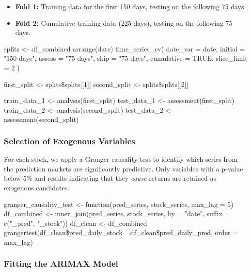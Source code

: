 \documentclass[12pt]{report}
\begin{document}
\begin{itemize}
    \item \textbf{Fold 1:} Training data for the first 150 days, testing on the following 75 days.
    \item \textbf{Fold 2:} Cumulative training data (225 days), testing on the following 75 days.
\end{itemize}

\begin{code}
splits <- df_combined %
  arrange(date) %
  time_series_cv(
    date_var   = date,
    initial    = "150 days",
    assess     = "75 days",
    skip       = "75 days",
    cumulative = TRUE,
    slice_limit = 2
  )
\end{code}

\begin{code}
first_split <- splits\$splits[[1]]
second_split <- splits\$splits[[2]]

train_data_1 <- analysis(first_split)
test_data_1  <- assessment(first_split)
train_data_2 <- analysis(second_split)
test_data_2  <- assessment(second_split)
\end{code}


\subsubsection{Selection of Exogenous Variables}

For each stock, we apply a Granger causality test to identify which series from the prediction markets are significantly predictive. Only variables with a p-value below 5\% and results indicating that they \textit{cause} returns are retained as exogenous candidates.\\


\begin{code}[language=R,caption={Test de causalité de Granger entre les séries}]
granger_causality_test <- function(pred_series, stock_series, max_lag = 5) {
  df_combined <- inner_join(pred_series, stock_series, by = "date", suffix = c("_pred", "_stock"))
  df_clean <- df_combined %
  grangertest(df_clean\$pred_daily_stock ~ df_clean\$pred_daily_pred, order = max_lag)
}
\end{code}

\subsubsection{Fitting the ARIMAX Model}
\end{document}
